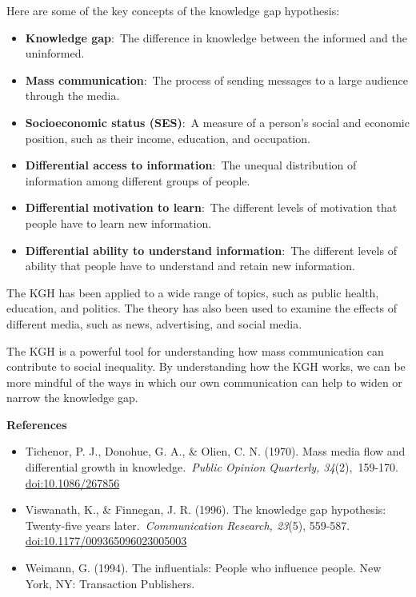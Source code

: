 \documentclass[
]{book}
\begin{document}
Here are some of the key concepts of the knowledge gap hypothesis:

\begin{itemize}
\item
  \textbf{Knowledge gap}:~The difference in knowledge between the informed and the uninformed.
\item
  \textbf{Mass communication}:~The process of sending messages to a large audience through the media.
\item
  \textbf{Socioeconomic status (SES)}:~A measure of a person's social and economic position, such as their income, education, and occupation.
\item
  \textbf{Differential access to information}:~The unequal distribution of information among different groups of people.
\item
  \textbf{Differential motivation to learn}:~The different levels of motivation that people have to learn new information.
\item
  \textbf{Differential ability to understand information}:~The different levels of ability that people have to understand and retain new information.
\end{itemize}

The KGH has been applied to a wide range of topics, such as public health, education, and politics. The theory has also been used to examine the effects of different media, such as news, advertising, and social media.

The KGH is a powerful tool for understanding how mass communication can contribute to social inequality. By understanding how the KGH works, we can be more mindful of the ways in which our own communication can help to widen or narrow the knowledge gap.

\textbf{References}

\begin{itemize}
\item
  Tichenor, P. J., Donohue, G. A., \& Olien, C. N. (1970). Mass media flow and differential growth in knowledge.~\emph{Public Opinion Quarterly, 34}(2),~159-170. \url{doi:10.1086/267856}
\item
  Viswanath, K., \& Finnegan, J. R. (1996). The knowledge gap hypothesis: Twenty-five years later.~\emph{Communication Research, 23}(5), 559-587. \url{doi:10.1177/009365096023005003}
\item
  Weimann, G. (1994). The influentials: People who influence people. New York, NY: Transaction Publishers.
\end{itemize}
\end{document}
